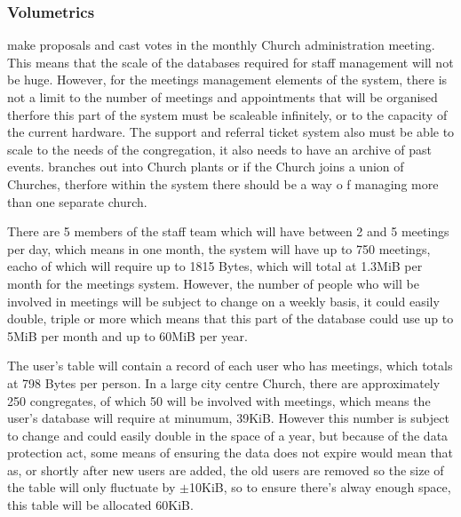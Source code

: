 \subsubsection{Volumetrics}
	make proposals and cast votes in the monthly Church administration meeting. This means that the scale of the databases required for staff
	management will not be huge. However, for the meetings management elements of the system, there is not a limit to the number of meetings
	and appointments that will be organised therfore this part of the system must be scaleable infinitely, or to the capacity of the current
	hardware. The support and referral ticket system also must be able to scale to the needs of the congregation, it also needs to have an
	archive of past events.
	branches out into Church plants or if the Church joins a union of Churches, therfore within the system there should be a way o
	f managing more than one separate church.

	There are 5 members of the staff team which will have between 2 and 5 meetings per day, which means in one month, the system will
	have up to 750 meetings, eacho of which will require up to 1815 Bytes, which will total at 1.3MiB per month for the meetings system.
	However, the number of people who will be involved in meetings will be subject to change on a weekly basis, it could easily double,
	triple or more which means that this part of the database could use up to 5MiB per month and up to 60MiB per year.

	The user's table will contain a record of each user who has meetings, which totals at 798 Bytes per person. In a large city
	centre Church, there are approximately 250 congregates, of which 50 will be involved with meetings, which means the user's
	database will require at minumum, 39KiB. However this number is subject to change and could easily double in the space of a year,
	but because of the data protection act, some means of ensuring the data does not expire would mean that as, or shortly after new users
	are added, the old users are removed so the size of the table will only fluctuate by $\pm$10KiB, so to ensure there's alway enough space,
	this table will be allocated 60KiB.

